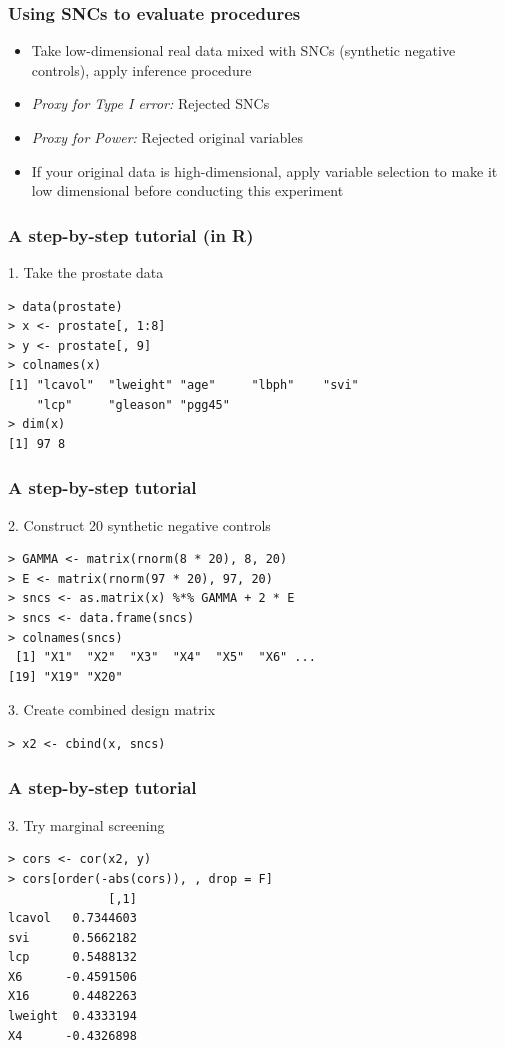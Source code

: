 \documentclass{beamer}
\begin{document}
\begin{frame}
\frametitle{Using SNCs to evaluate procedures}
\begin{itemize}
\item Take low-dimensional real data mixed with SNCs (synthetic negative controls), apply inference procedure
\item \emph{Proxy for Type I error:} Rejected SNCs
\item \emph{Proxy for Power:} Rejected original variables
\item If your original data is high-dimensional, apply variable selection to make it low dimensional before conducting this experiment
\end{itemize}
\end{frame}

\begin{frame}[fragile]
\frametitle{A step-by-step tutorial (in R)}
1. Take the prostate data
\begin{verbatim}
> data(prostate)
> x <- prostate[, 1:8]
> y <- prostate[, 9]
> colnames(x)
[1] "lcavol"  "lweight" "age"     "lbph"    "svi"
    "lcp"     "gleason" "pgg45"  
> dim(x)
[1] 97 8
\end{verbatim}
\end{frame}

\begin{frame}[fragile]
\frametitle{A step-by-step tutorial}
2. Construct 20 synthetic negative controls
\begin{verbatim}
> GAMMA <- matrix(rnorm(8 * 20), 8, 20)
> E <- matrix(rnorm(97 * 20), 97, 20)
> sncs <- as.matrix(x) %*% GAMMA + 2 * E
> sncs <- data.frame(sncs)
> colnames(sncs)
 [1] "X1"  "X2"  "X3"  "X4"  "X5"  "X6" ...
[19] "X19" "X20"
\end{verbatim}
3. Create combined design matrix
\begin{verbatim}
> x2 <- cbind(x, sncs)
\end{verbatim}
\end{frame}

\begin{frame}[fragile]
\frametitle{A step-by-step tutorial}
3. Try marginal screening
\begin{verbatim}
> cors <- cor(x2, y)
> cors[order(-abs(cors)), , drop = F]
              [,1]
lcavol   0.7344603
svi      0.5662182
lcp      0.5488132
X6      -0.4591506
X16      0.4482263
lweight  0.4333194
X4      -0.4326898
\end{verbatim}
\end{frame}
\end{document}
